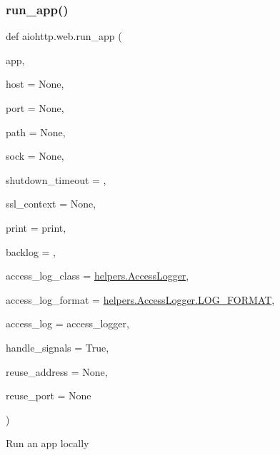 \subsubsection{\texorpdfstring{run\+\_\+app()}{run\_app()}}
{\footnotesize\ttfamily def aiohttp.\+web.\+run\+\_\+app (\begin{DoxyParamCaption}\item[{}]{app,  }\item[{}]{host = {\ttfamily None},  }\item[{}]{port = {\ttfamily None},  }\item[{}]{path = {\ttfamily None},  }\item[{}]{sock = {\ttfamily None},  }\item[{}]{shutdown\+\_\+timeout = {},  }\item[{}]{ssl\+\_\+context = {\ttfamily None},  }\item[{}]{print = {\ttfamily print},  }\item[{}]{backlog = {},  }\item[{}]{access\+\_\+log\+\_\+class = {\ttfamily \hyperlink{classaiohttp_1_1helpers_1_1_access_logger}{helpers.\+Access\+Logger}},  }\item[{}]{access\+\_\+log\+\_\+format = {\ttfamily \hyperlink{classaiohttp_1_1helpers_1_1_access_logger_afe6ba89c38a66f34c42fd1c1dd0f79a1}{helpers.\+Access\+Logger.\+L\+O\+G\+\_\+\+F\+O\+R\+M\+AT}},  }\item[{}]{access\+\_\+log = {\ttfamily access\+\_\+logger},  }\item[{}]{handle\+\_\+signals = {\ttfamily True},  }\item[{}]{reuse\+\_\+address = {\ttfamily None},  }\item[{}]{reuse\+\_\+port = {\ttfamily None} }\end{DoxyParamCaption})}

\begin{DoxyVerb}Run an app locally\end{DoxyVerb}
 